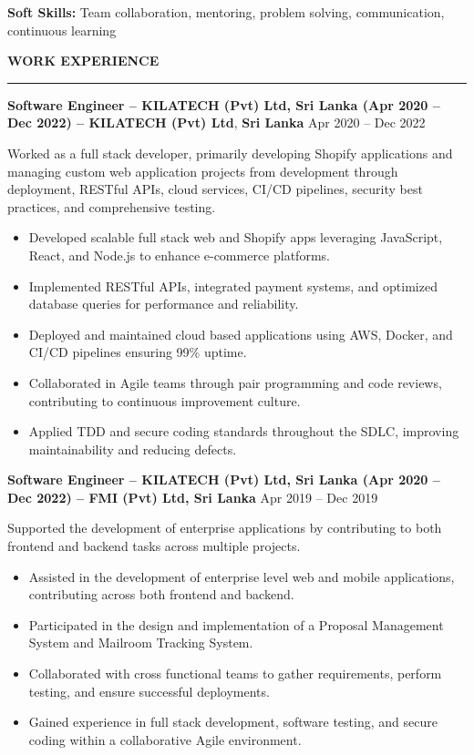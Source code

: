 \documentclass[10pt,letterpaper]{article}
\begin{document}
\textbf{Soft Skills:} Team collaboration, mentoring, problem solving, communication, continuous learning

\vspace{6pt}

\textbf{WORK EXPERIENCE}\\[-8pt]
\noindent\rule{\textwidth}{1pt}

\vspace{-2pt}

\textbf{Software Engineer – KILATECH (Pvt) Ltd, Sri Lanka (Apr 2020 – Dec 2022) -- KILATECH (Pvt) Ltd}, \textbf{Sri Lanka} \hfill Apr 2020 -- Dec 2022

\vspace{1pt}

Worked as a full stack developer, primarily developing Shopify applications and managing custom web application projects from development through deployment, RESTful APIs, cloud services, CI/CD pipelines, security best practices, and comprehensive testing.

\begin{itemize}
\item Developed scalable full stack web and Shopify apps leveraging JavaScript, React, and Node.js to enhance e-commerce platforms.
\item Implemented RESTful APIs, integrated payment systems, and optimized database queries for performance and reliability.
\item Deployed and maintained cloud based applications using AWS, Docker, and CI/CD pipelines ensuring 99\% uptime.
\item Collaborated in Agile teams through pair programming and code reviews, contributing to continuous improvement culture.
\item Applied TDD and secure coding standards throughout the SDLC, improving maintainability and reducing defects.
\end{itemize}

\textbf{Software Engineer – KILATECH (Pvt) Ltd, Sri Lanka (Apr 2020 – Dec 2022) -- FMI (Pvt) Ltd, Sri Lanka} \hfill Apr 2019 -- Dec 2019

\vspace{1pt}

Supported the development of enterprise applications by contributing to both frontend and backend tasks across multiple projects.

\begin{itemize}
\item Assisted in the development of enterprise level web and mobile applications, contributing across both frontend and backend.
\item Participated in the design and implementation of a Proposal Management System and Mailroom Tracking System.
\item Collaborated with cross functional teams to gather requirements, perform testing, and ensure successful deployments.
\item Gained experience in full stack development, software testing, and secure coding within a collaborative Agile environment.
\end{itemize}
\end{document}
